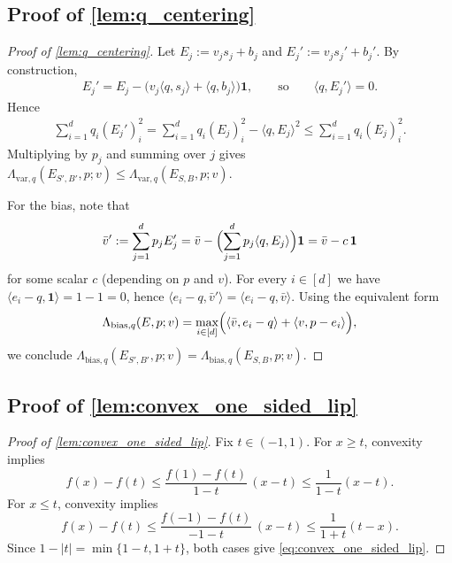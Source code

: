 \documentclass{article}
\theoremstyle{plain}
\theoremstyle{definition}
\theoremstyle{plain}
\begin{document}
\subsection{Proof of \texorpdfstring{\cref{lem:q_centering}}{Lemma (Column-wise q-centering helps)}}
\label{proof:lem:q_centering}
\begin{proof}[Proof of \cref{lem:q_centering}]
    Let $E_j := v_j s_j + b_j$ and $E_j' := v_j s_j' + b_j'$.
    By construction,
    \begin{align}
        E_j' = E_j - \bigl(v_j\langle q,s_j\rangle + \langle q,b_j\rangle\bigr)\mathbf{1},
        \qquad\text{so}\qquad
        \langle q, E_j'\rangle = 0.
    \end{align}
    Hence
    \begin{align}
        \sum_{i=1}^d q_i (E_j')_i^2
        = \sum_{i=1}^d q_i (E_j)_i^2 - \langle q,E_j\rangle^2
        \le \sum_{i=1}^d q_i (E_j)_i^2.
    \end{align}
    Multiplying by $p_j$ and summing over $j$ gives
    $\Lambda_{\text{var},q}(E_{S',B'},p;v)\le \Lambda_{\text{var},q}(E_{S,B},p;v)$.

    For the bias, note that
    \begin{align}
        \bar v' := \sum_{j=1}^d p_j E_j'
        = \bar v - \Bigl(\sum_{j=1}^d p_j\langle q,E_j\rangle\Bigr)\mathbf{1}
        = \bar v - c\,\mathbf{1}
    \end{align}
    for some scalar $c$ (depending on $p$ and $v$). For every $i\in[d]$ we have
    $\langle e_i-q,\mathbf{1}\rangle = 1-1=0$, hence
    $\langle e_i-q,\bar v'\rangle=\langle e_i-q,\bar v\rangle$.
    Using the equivalent form
    \[
        \Lambda_{\text{bias}, q}(E, p ; v)
        =
        \max_{i \in [d]}
        \Bigl(
        \langle \bar{v}, e_i - q \rangle
        +
        \langle v, p - e_i \rangle
        \Bigr),
    \]
    we conclude $\Lambda_{\text{bias},q}(E_{S',B'},p;v)=\Lambda_{\text{bias},q}(E_{S,B},p;v)$.
\end{proof}

\subsection{Proof of \texorpdfstring{\cref{lem:convex_one_sided_lip}}{Lemma (A one-sided Lipschitz bound)}}
\label{proof:lem:convex_one_sided_lip}
\begin{proof}[Proof of \cref{lem:convex_one_sided_lip}]
    Fix $t\in(-1,1)$.
    For $x\ge t$, convexity implies
    \[
        f(x)-f(t)\le \frac{f(1)-f(t)}{1-t}\,(x-t)\le \frac{1}{1-t}(x-t).
    \]
    For $x\le t$, convexity implies
    \[
        f(x)-f(t)\le \frac{f(-1)-f(t)}{-1-t}\,(x-t)\le \frac{1}{1+t}(t-x).
    \]
    Since $1-|t|=\min\{1-t,1+t\}$, both cases give \eqref{eq:convex_one_sided_lip}.
\end{proof}
\end{document}
